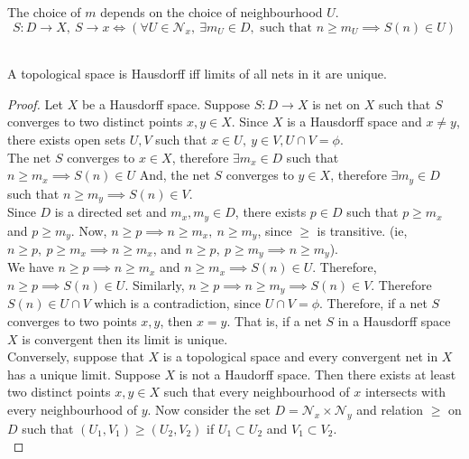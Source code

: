 \begin{remark}
	The choice of $m$ depends on the choice of neighbourhood $U$.
	$$S: D \to X,\ S \to x \iff \left( \forall U \in \mathcal{N}_x,\ \exists m_U \in D,\text{ such that } n \ge m_U \implies S(n) \in U \right)$$
\end{remark}

\begin{theorem}\cite[10.1.4]{joshi}\\
	A topological space is Hausdorff iff limits of all nets in it are unique.
\end{theorem}
\begin{proof}
	Let $X$ be a  Hausdorff space. Suppose $S : D \to X$ is net on $X$ such that $S$ converges to two distinct points $x,y \in X$.
	Since $X$ is a Hausdorff space and $x \ne y$, there exists open sets $U,V$ such that $x \in U,\ y \in V, U \cap V = \phi$.\\

	The net $S$ converges to $x \in X$, therefore $\exists m_x \in D$ such that $n \ge m_x \implies S(n) \in U$
	And, the net $S$ converges to $y \in X$, therefore $\exists m_y \in D$ such that $n \ge m_y \implies S(n) \in V$.\\

	Since $D$ is a directed set and $m_x, m_y \in D$, there exists $p \in D$ such that $p \ge m_x$ and $p \ge m_y$. Now, $n \ge p \implies n \ge m_x,\ n \ge m_y$, since $\ge$ is transitive. (ie, $n \ge p,\ p \ge m_x \implies n \ge m_x$, and $n \ge p,\ p \ge m_y \implies n \ge m_y$).\\

	We have $n \ge p \implies n \ge m_x$ and $n \ge m_x \implies S(n) \in U$. Therefore, $n \ge p \implies S(n) \in U$. Similarly, $n \ge p \implies n \ge m_y \implies S(n) \in V$. Therefore $S(n) \in U \cap V$ which is a contradiction, since $U \cap V = \phi$. Therefore, if a net $S$ converges to two points $x,y$, then $x = y$. That is, if a net $S$ in a Hausdorff space $X$ is convergent then its limit is unique.\\

	Conversely, suppose that $X$ is a topological space and every convergent net in $X$ has a unique limit. Suppose $X$ is not a Haudorff space. Then there exists at least two distinct points $x,y \in X$ such that every neighbourhood of $x$ intersects with every neighbourhood of $y$. Now consider the set $D = \mathcal{N}_x \times \mathcal{N}_y$ and relation $\ge$ on $D$ such that $(U_1,V_1) \ge (U_2,V_2)$ if $U_1 \subset U_2$ and $V_1 \subset V_2$.\\


\end{proof}
